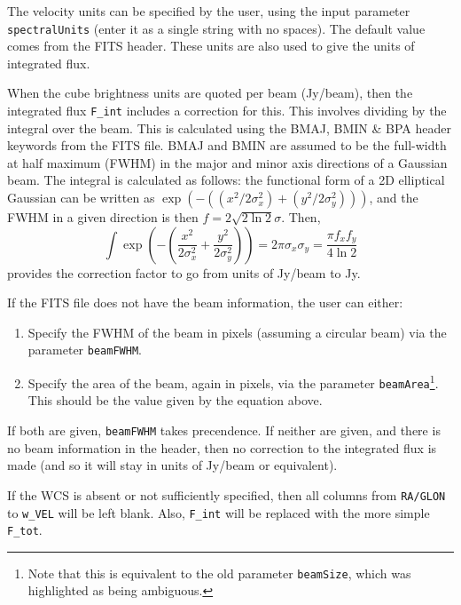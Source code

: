 The velocity units can be specified by the user, using the input
parameter \texttt{spectralUnits} (enter it as a single string with no
spaces). The default value comes from the FITS header. These units are
also used to give the units of integrated flux.

When the cube brightness units are quoted per beam (\eg Jy/beam), then
the integrated flux \texttt{F\_int} includes a correction for
this. This involves dividing by the integral over the beam. This is
calculated using the BMAJ, BMIN \& BPA header keywords from the FITS
file. BMAJ and BMIN are assumed to be the full-width at half maximum
(FWHM) in the major and minor axis directions of a Gaussian beam. The
integral is calculated as follows: the functional form of a 2D
elliptical Gaussian can be written as
$\exp(-((x^2/2\sigma_x^2)+(y^2/2\sigma_y^2)))$, and the FWHM in a
given direction is then $f=2\sqrt{2\ln2}\sigma$. Then, 
\[
\int
\exp\left(-\left(\frac{x^2}{2\sigma_x^2}+\frac{y^2}{2\sigma_y^2}\right)\right)
= 2\pi\sigma_x\sigma_y
=\frac{\pi f_x f_y}{4\ln2}
\]
provides the correction factor to go from units of Jy/beam to Jy. 

If the FITS file does not have the beam information, the user can
either:
\begin{enumerate}
\item Specify the FWHM of the beam in pixels (assuming a circular
  beam) via the parameter \texttt{beamFWHM}.
\item Specify the area of the beam, again in pixels, via the parameter
  \texttt{beamArea}\footnote{Note that this is equivalent to the old
    parameter \texttt{beamSize}, which was highlighted as being
    ambiguous.}. This should be the value given by the equation above.
\end{enumerate}
If both are given, \texttt{beamFWHM} takes precendence. If neither are
given, and there is no beam information in the header, then no
correction to the integrated flux is made (and so it will stay in
units of Jy/beam or equivalent).

If the WCS is absent or not sufficiently specified, then all columns
from \texttt{RA/GLON} to \texttt{w\_VEL} will be left blank. Also,
\texttt{F\_int} will be replaced with the more simple \texttt{F\_tot}.


